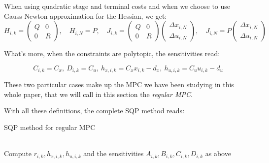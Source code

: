 \documentclass[12pt]{article}
\begin{document}
When using quadratic stage and terminal costs and when we choose to use Gauss-Newton approximation for the Hessian, we get:
\begin{equation*}
	H_{i,k}=\begin{pmatrix}Q&0\\0&R\end{pmatrix},\quad H_{i,N}=P,\quad J_{i,k}=\begin{pmatrix}Q&0\\0&R\end{pmatrix}\begin{pmatrix}\Delta x_{i,N}\\\Delta u_{i,N}\end{pmatrix},\quad J_{i,N}=P\begin{pmatrix}\Delta x_{i,N}\\\Delta u_{i,N}\end{pmatrix}
\end{equation*}

\noindent What's more, when the constraints are polytopic, the sensitivities read:

\begin{equation*}
	C_{i,k}=C_x,~D_{i,k}=C_u,~h_{x,i,k}=C_xx_{i,k}-d_x,~h_{u,i,k}=C_uu_{i,k}-d_u
\end{equation*}

These two particular cases make up the MPC we have been studying in this whole paper, that we will call in this section the \textit{regular MPC}.


\noindent With all these definitions, the complete SQP method reads:

\begin{algorithm}[H]
	\caption{SQP method for regular MPC}
	\label{algo:SQP-reg}
	\begin{algorithmic}[1]
	 
	 
	\\
		\qquad \quad Compute $r_{i,k}, h_{x,i,k}, h_{u,i,k}$ and the sensitivities $A_{i,k}, B_{i,k}, C_{i,k}, D_{i,k}$ as above
		 
	\EndWhile
	\EndProcedure
	\end{algorithmic}
\end{algorithm}
\end{document}
